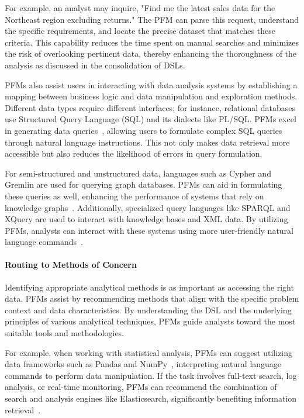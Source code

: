 For example, an analyst may inquire, "Find me the latest sales data for the Northeast region excluding returns." The PFM can parse this request, understand the specific requirements, and locate the precise dataset that matches these criteria. This capability reduces the time spent on manual searches and minimizes the risk of overlooking pertinent data, thereby enhancing the thoroughness of the analysis as discussed in the consolidation of DSLs.

PFMs also assist users in interacting with data analysis systems by establishing a mapping between business logic and data manipulation and exploration methods. Different data types require different interfaces; for instance, relational databases use Structured Query Language (SQL) and its dialects like PL/SQL. PFMs excel in generating data queries~\cite{li2023resdsql, gu2023few, cheng2022binding}, allowing users to formulate complex SQL queries through natural language instructions. This not only makes data retrieval more accessible but also reduces the likelihood of errors in query formulation.

For semi-structured and unstructured data, languages such as Cypher and Gremlin are used for querying graph databases. PFMs can aid in formulating these queries as well, enhancing the performance of systems that rely on knowledge graphs~\cite{huang2023kosa}. Additionally, specialized query languages like SPARQL and XQuery are used to interact with knowledge bases and XML data. By utilizing PFMs, analysts can interact with these systems using more user-friendly natural language commands~\cite{li2024flexkbqa, Lehmann2023LanguageMA}.

\paragraph{Routing to Methods of Concern}

Identifying appropriate analytical methods is as important as accessing the right data. PFMs assist by recommending methods that align with the specific problem context and data characteristics. By understanding the DSL and the underlying principles of various analytical techniques, PFMs guide analysts toward the most suitable tools and methodologies.

For example, when working with statistical analysis, PFMs can suggest utilizing data frameworks such as Pandas and NumPy~\cite{lai2023ds}, interpreting natural language commands to perform data manipulation. If the task involves full-text search, log analysis, or real-time monitoring, PFMs can recommend the combination of search and analysis engines like Elasticsearch, significantly benefiting information retrieval~\cite{zhu2024retrieval}.

